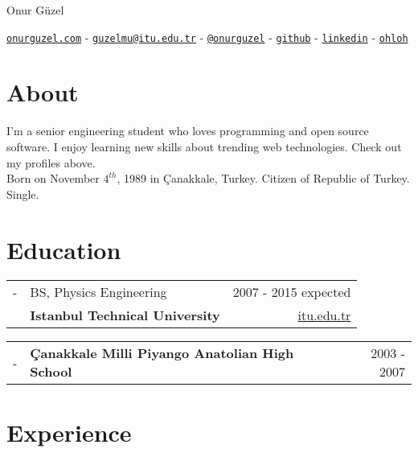 \documentclass[11pt,a4paper]{article}
\author{\name}
\title{\cv}
\def\name{Onur Güzel}
\renewenvironment{itemize}{
  \begin{list}{}{
    \setlength{\leftmargin}{0em}
  }
}{
  \end{list}
}
\begin{document}

\begin{flushright}
\Huge \name
\end{flushright}

\begin{center}
\href{http://www.onurguzel.com/}{\tt onurguzel.com} - 
\href{mailto:guzelmu@itu.edu.tr}{\tt guzelmu@itu.edu.tr} - 
\href{http://onurguzel.com/twitter}{\tt @onurguzel} - 
\href{http://onurguzel.com/github}{\tt github} - 
\href{http://linkedin.com/in/guzelmu}{\tt linkedin} - 
\href{http://www.ohloh.net/accounts/onurguzel}{\tt ohloh}
\end{center}

\section*{About}
I'm a senior engineering student who loves programming and open source software. I enjoy learning new skills about trending web technologies. Check out my profiles above.\\[10pt]
Born on November $4^{th}$, 1989 in Çanakkale, Turkey. Citizen of Republic of Turkey. Single.

\section*{Education}
\begin{itemize}
\item
\begin{tabularx}{\textwidth}{ l X r }
- & BS, Physics Engineering & 2007 - 2015 expected \\
& \textbf{Istanbul Technical University} & \href{http://www.itu.edu.tr/en/}{itu.edu.tr}
\end{tabularx}
\item
\begin{tabularx}{\textwidth}{l X r}
- & \textbf{Çanakkale Milli Piyango Anatolian High School} & 2003 - 2007
\end{tabularx}
\end{itemize}

\section*{Experience}
\end{document}
